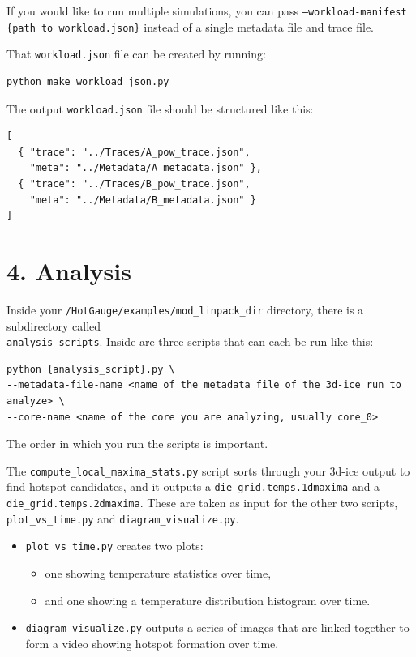 \documentclass[11pt]{article}
\begin{document}
If you would like to run multiple simulations, you can pass
\texttt{--workload-manifest \{path to workload.json\}} instead of a single metadata file and trace file.

That \texttt{workload.json} file can be created by running:
\begin{lstlisting}
python make_workload_json.py
\end{lstlisting}
The output \verb|workload.json| file should be structured like this:

\begin{lstlisting}
[
  { "trace": "../Traces/A_pow_trace.json",
    "meta": "../Metadata/A_metadata.json" },
  { "trace": "../Traces/B_pow_trace.json",
    "meta": "../Metadata/B_metadata.json" }
]
\end{lstlisting}

\section*{4. Analysis}

Inside your \verb|/HotGauge/examples/mod_linpack_dir| directory, there is a subdirectory called \\
\verb|analysis_scripts|. Inside are three scripts that can each be run like this:

\begin{lstlisting}
python {analysis_script}.py \
--metadata-file-name <name of the metadata file of the 3d-ice run to analyze> \
--core-name <name of the core you are analyzing, usually core_0>
\end{lstlisting}

The order in which you run the scripts is important.

The \texttt{compute\_local\_maxima\_stats.py} script sorts through your 3d-ice output to find hotspot candidates,
and it outputs a \texttt{die\_grid.temps.1dmaxima} and a \texttt{die\_grid.temps.2dmaxima}.
These are taken as input for the other two scripts,
\texttt{plot\_vs\_time.py} and \texttt{diagram\_visualize.py}.

\begin{itemize}[leftmargin=2em]
    \item \texttt{plot\_vs\_time.py} creates two plots:
    \begin{itemize}
        \item one showing temperature statistics over time,
        \item and one showing a temperature distribution histogram over time.
    \end{itemize}
    
    \item \texttt{diagram\_visualize.py} outputs a series of images that are linked together to form a video showing hotspot formation over time. 
\end{itemize}
\end{document}
